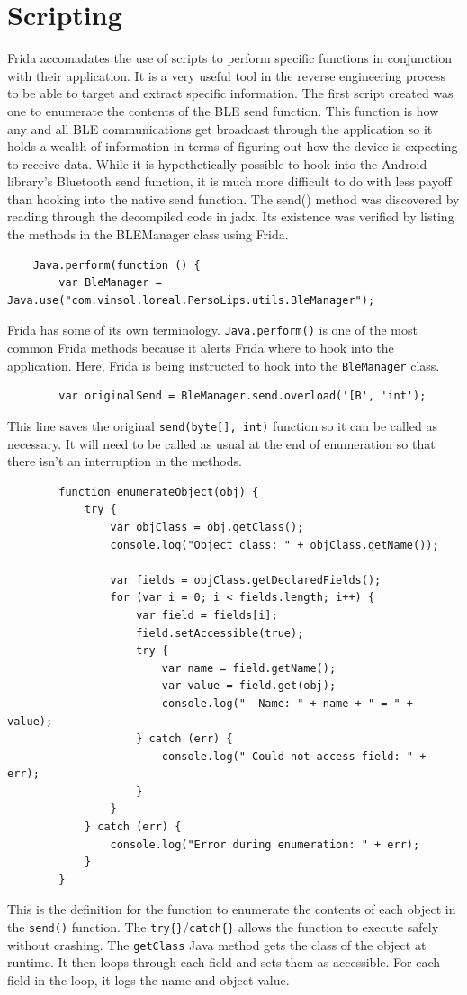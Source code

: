 \section{Scripting}
Frida accomadates the use of scripts to perform specific functions in conjunction with their application. It is a very useful tool in the reverse engineering process to be able to target and extract specific information. The first script created was one to enumerate the contents of the BLE send function. This function is how any and all BLE communications get broadcast through the application so it holds a wealth of information in terms of figuring out how the device is expecting to receive data. While it is hypothetically possible to hook into the Android library's Bluetooth send function, it is much more difficult to do with less payoff than hooking into the native send function. The send() method was discovered by reading through the decompiled code in jadx. Its existence was verified by listing the methods in the BLEManager class using Frida.
\begin{lstlisting}
	Java.perform(function () {
		var BleManager = Java.use("com.vinsol.loreal.PersoLips.utils.BleManager");
	\end{lstlisting}
	Frida has some of its own terminology. \texttt{Java.perform()} is one of the most common Frida methods because it alerts Frida where to hook into the application. Here, Frida is being instructed to hook into the \texttt{BleManager} class.
	
	\begin{lstlisting}
		var originalSend = BleManager.send.overload('[B', 'int');
	\end{lstlisting}
	This line saves the original \texttt{send(byte[], int)} function so it can be called as necessary. It will need to be called as usual at the end of enumeration so that there isn’t an interruption in the methods.
	
	\begin{lstlisting}
		function enumerateObject(obj) {
			try {
				var objClass = obj.getClass();
				console.log("Object class: " + objClass.getName());
				
				var fields = objClass.getDeclaredFields();
				for (var i = 0; i < fields.length; i++) {
					var field = fields[i];
					field.setAccessible(true);
					try {
						var name = field.getName();
						var value = field.get(obj);
						console.log("  Name: " + name + " = " + value);
					} catch (err) {
						console.log(" Could not access field: " + err);
					}
				}
			} catch (err) {
				console.log("Error during enumeration: " + err);
			}
		}
	\end{lstlisting}
	This is the definition for the function to enumerate the contents of each object in the \texttt{send()} function. The \texttt{try\{\}}/\texttt{catch\{\}} allows the function to execute safely without crashing. The \texttt{getClass} Java method gets the class of the object at runtime. It then loops through each field and sets them as accessible. For each field in the loop, it logs the name and object value.
	
